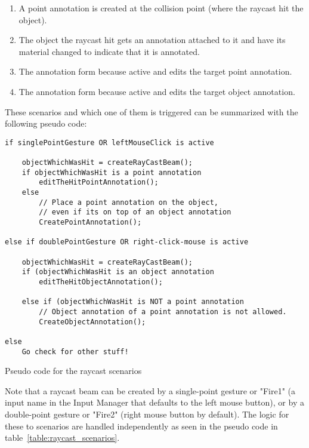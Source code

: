 \begin{enumerate}
    \item A point annotation is created at the collision point (where the raycast hit the object).
    \item The object the raycast hit gets an annotation attached to it and have its material changed to indicate that it is annotated.
    \item The annotation form because active and edits the target point annotation.
    \item The annotation form because active and edits the target object annotation.
\end{enumerate}
 
These scenarios and which one of them is triggered can be summarized with the following pseudo code:

\begin{table}
\label{table:raycast_scenarios}
\begin{lstlisting}
if singlePointGesture OR leftMouseClick is active
    
    objectWhichWasHit = createRayCastBeam();
    if objectWhichWasHit is a point annotation
        editTheHitPointAnnotation();
    else 
        // Place a point annotation on the object, 
        // even if its on top of an object annotation
        CreatePointAnnotation();  

else if doublePointGesture OR right-click-mouse is active   
    
    objectWhichWasHit = createRayCastBeam();
    if (objectWhichWasHit is an object annotation
        editTheHitObjectAnnotation();

    else if (objectWhichWasHit is NOT a point annotation
        // Object annotation of a point annotation is not allowed.
        CreateObjectAnnotation(); 

else 
    Go check for other stuff!                                                                 
\end{lstlisting}
\caption[Pseudo code for the raycast scenarios]{Pseudo code for the raycast scenarios} 
\end{table}

Note that a raycast beam can be created by a single-point gesture or "Fire1" (a input name in the Input Manager that defaults to the left mouse button), or 
by a double-point gesture or "Fire2" (right mouse button by default). The logic for these to scenarios are handled independently as seen in the pseudo code in 
table~\vref{table:raycast_scenarios}. %

